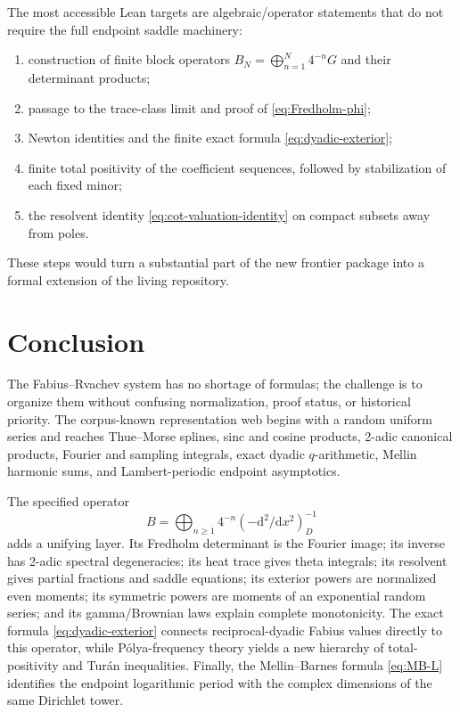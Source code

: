\documentclass[11pt,oneside]{article}
\theoremstyle{definition}
\begin{document}
The most accessible Lean targets are algebraic/operator statements that do not require
the full endpoint saddle machinery:
\begin{enumerate}[leftmargin=2em]
\item construction of finite block operators \(B_N=\bigoplus_{n=1}^N4^{-n}G\) and
      their determinant products;
\item passage to the trace-class limit and proof of \eqref{eq:Fredholm-phi};
\item Newton identities and the finite exact formula \eqref{eq:dyadic-exterior};
\item finite total positivity of the coefficient sequences, followed by stabilization
      of each fixed minor;
\item the resolvent identity \eqref{eq:cot-valuation-identity} on compact subsets away
      from poles.
\end{enumerate}
These steps would turn a substantial part of the new frontier package into a formal
extension of the living repository.

\section{Conclusion}
\label{sec:conclusion}

The Fabius--Rvachev system has no shortage of formulas; the challenge is to organize
them without confusing normalization, proof status, or historical priority.  The
corpus-known representation web begins with a random uniform series and reaches
Thue--Morse splines, sinc and cosine products, 2-adic canonical products, Fourier and
sampling integrals, exact dyadic \(q\)-arithmetic, Mellin harmonic sums, and
Lambert-periodic endpoint asymptotics.

The specified operator
\[
 B=\bigoplus_{n\ge1}4^{-n}(-\mathrm d^2/\mathrm dx^2)_D^{-1}
\]
adds a unifying layer.  Its Fredholm determinant is the Fourier image; its inverse has
2-adic spectral degeneracies; its heat trace gives theta integrals; its resolvent gives
partial fractions and saddle equations; its exterior powers are normalized even
moments; its symmetric powers are moments of an exponential random series; and its
gamma/Brownian laws explain complete monotonicity.  The exact formula
\eqref{eq:dyadic-exterior} connects reciprocal-dyadic Fabius values directly to this
operator, while P\'olya-frequency theory yields a new hierarchy of total-positivity and
Tur\'an inequalities.  Finally, the Mellin--Barnes formula \eqref{eq:MB-L} identifies
the endpoint logarithmic period with the complex dimensions of the same Dirichlet
tower.
\end{document}

